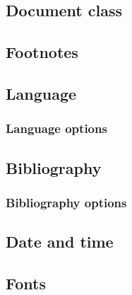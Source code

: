     \subsection*{\thesubsection\hspace{1em}Document \gls{class}}
    \label{sec:tutorial/preamble/doc}
    
    
    \subsection{Footnotes}
    \label{sec:tutorial/preamble/footnote}
    
    
    \subsection{Language}
    \label{sec:tutorial/preamble/language}
    
    
        \subsubsection{Language options}
        \label{sec:tutorial/preamble/language/options}
        
    
    \subsection{Bibliography}
    \label{sec:tutorial/preamble/bib}
    
    
        \subsubsection{Bibliography options}
        \label{sec:tutorial/preamble/bib/options}
        
    
    \subsection{Date and time}
    \label{sec:tutorial/preamble/datetime}
    
    
    \subsection{Fonts}
    \label{sec:tutorial/preamble/font}
    
    
